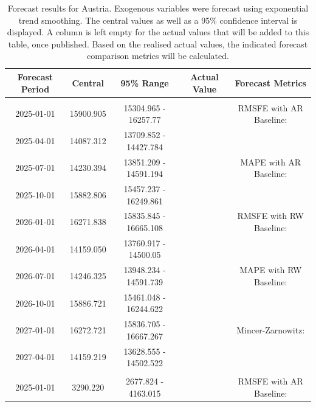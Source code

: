\begin{table}
\centering
\caption{\label{tab:forecast_AT}Forecast results for Austria. Exogenous variables were forecast using exponential trend smoothing. The central values as well as a 95\% confidence interval is displayed. A column is left empty for the actual values that will be added to this table, once published. Based on the realised actual values, the indicated forecast comparison metrics will be calculated. }
\centering
\fontsize{7}{9}\selectfont
\begin{tabular}[t]{ccccc}
\toprule
Forecast Period & Central & 95\% Range & Actual Value & Forecast Metrics\\
\midrule
\addlinespace[0.3em]
\multicolumn{5}{l}{\textbf{ElectrCons}}\\
\hspace{1em}2025-01-01 & 15900.905 & 15304.965 - 16257.77 &  & RMSFE with AR Baseline:\\
\hspace{1em}2025-04-01 & 14087.312 & 13709.852 - 14427.784 &  & \\
\hspace{1em}2025-07-01 & 14230.394 & 13851.209 - 14591.194 &  & MAPE with AR Baseline:\\
\hspace{1em}2025-10-01 & 15882.806 & 15457.237 - 16249.861 &  & \\
\hspace{1em}2026-01-01 & 16271.838 & 15835.845 - 16665.108 &  & RMSFE with RW Baseline:\\
\hspace{1em}2026-04-01 & 14159.050 & 13760.917 - 14500.05 &  & \\
\hspace{1em}2026-07-01 & 14246.325 & 13948.234 - 14591.739 &  & MAPE with RW Baseline:\\
\hspace{1em}2026-10-01 & 15886.721 & 15461.048 - 16244.622 &  & \\
\hspace{1em}2027-01-01 & 16272.721 & 15836.705 - 16667.267 &  & Mincer-Zarnowitz:\\
\hspace{1em}2027-04-01 & 14159.219 & 13628.555 - 14502.522 &  & \\
\addlinespace[0.3em]
\multicolumn{5}{l}{\textbf{EmiCO2ElecHeat}}\\
\hspace{1em}2025-01-01 & 3290.220 & 2677.824 - 4163.015 &  & RMSFE with AR Baseline:\\

\end{tabular}
\end{table}
